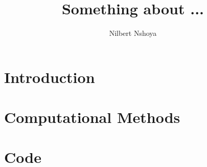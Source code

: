 \documentclass[12pt,lot,lof]{puthesis_undergraduate}
\title{Something about ...}
\author{Nilbert Nshoya}
\begin{document}
\chapter{Introduction}\label{ch:intro}  %


\chapter{Computational Methods}\label{ch:methods}





\appendix
\chapter{Code}




 \label{bib}
\end{document}
